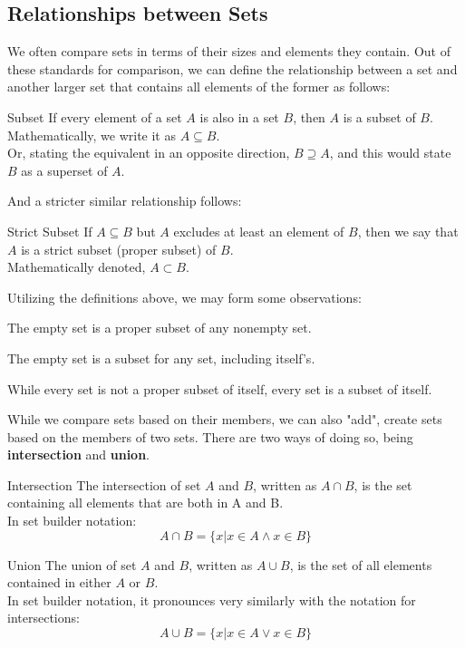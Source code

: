 \subsection{Relationships between Sets}
We often compare sets in terms of their sizes and elements they contain. Out of these standards for comparison, we can define the relationship between a set and another larger set that contains all elements of the former as follows:
\begin{ln-define}{Subset}{}
    If every element of a set $A$ is also in a set $B$, then $A$ is a subset of $B$. \\
    Mathematically, we write it as $A \subseteq B$. \\
    Or, stating the equivalent in an opposite direction, $B \supseteq A$, and this would state $B$ as a superset of $A$.
\end{ln-define}
And a stricter similar relationship follows:
\begin{ln-define}{Strict Subset}{}
    If $A \subseteq B$ but $A$ excludes at least an element of $B$, then we say that $A$ is a strict subset (proper subset) of $B$. \\
    Mathematically denoted, $A \subset B$.
\end{ln-define}
Utilizing the definitions above, we may form some observations:
\begin{bindenum}
    \item The empty set is a proper subset of any nonempty set.
    \item The empty set is a subset for any set, including itself's.
    \item While every set is not a proper subset of itself, every set is a subset of itself.
\end{bindenum}
While we compare sets based on their members, we can also "add", create sets based on the members of two sets. There are two ways of doing so, being \textbf{intersection} and \textbf{union}.
\begin{ln-define}{Intersection}{}
    The intersection of set $A$ and $B$, written as $A \cap B$, is the set containing all elements that are both in A and B. \\
    In set builder notation:
    \[A \cap B = \{x | x \in A \land x \in B\}\]
\end{ln-define}
\begin{ln-define}{Union}{}
    The union of set $A$ and $B$, written as $A \cup B$, is the set of all elements contained in either $A$ or $B$. \\
    In set builder notation, it pronounces very similarly with the notation for intersections:
    \[A \cup B = \{x | x \in A \lor x \in B\}\]
\end{ln-define}

